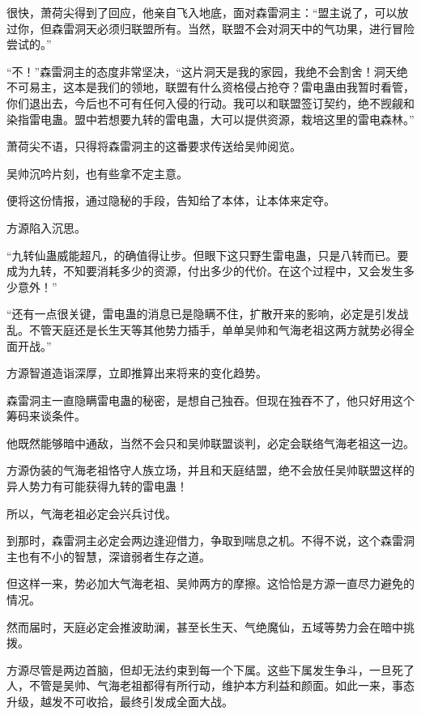 
\begin{this_body}



很快，萧荷尖得到了回应，他亲自飞入地底，面对森雷洞主：“盟主说了，可以放过你，但森雷洞天必须归联盟所有。当然，联盟不会对洞天中的气功果，进行冒险尝试的。”

“不！”森雷洞主的态度非常坚决，“这片洞天是我的家园，我绝不会割舍！洞天绝不可易主，这本是我们的领地，联盟有什么资格侵占抢夺？雷电蛊由我暂时看管，你们退出去，今后也不可有任何入侵的行动。我可以和联盟签订契约，绝不觊觎和染指雷电蛊。盟中若想要九转的雷电蛊，大可以提供资源，栽培这里的雷电森林。”

萧荷尖不语，只得将森雷洞主的这番要求传送给吴帅阅览。

吴帅沉吟片刻，也有些拿不定主意。

便将这份情报，通过隐秘的手段，告知给了本体，让本体来定夺。

方源陷入沉思。

“九转仙蛊威能超凡，的确值得让步。但眼下这只野生雷电蛊，只是八转而已。要成为九转，不知要消耗多少的资源，付出多少的代价。在这个过程中，又会发生多少意外！”

“还有一点很关键，雷电蛊的消息已是隐瞒不住，扩散开来的影响，必定是引发战乱。不管天庭还是长生天等其他势力插手，单单吴帅和气海老祖这两方就势必得全面开战。”

方源智道造诣深厚，立即推算出来将来的变化趋势。

森雷洞主一直隐瞒雷电蛊的秘密，是想自己独吞。但现在独吞不了，他只好用这个筹码来谈条件。

他既然能够暗中通敌，当然不会只和吴帅联盟谈判，必定会联络气海老祖这一边。

方源伪装的气海老祖恪守人族立场，并且和天庭结盟，绝不会放任吴帅联盟这样的异人势力有可能获得九转的雷电蛊！

所以，气海老祖必定会兴兵讨伐。

到那时，森雷洞主必定会两边逢迎借力，争取到喘息之机。不得不说，这个森雷洞主也有不小的智慧，深谙弱者生存之道。

但这样一来，势必加大气海老祖、吴帅两方的摩擦。这恰恰是方源一直尽力避免的情况。

然而届时，天庭必定会推波助澜，甚至长生天、气绝魔仙，五域等势力会在暗中挑拨。

方源尽管是两边首脑，但却无法约束到每一个下属。这些下属发生争斗，一旦死了人，不管是吴帅、气海老祖都得有所行动，维护本方利益和颜面。如此一来，事态升级，越发不可收拾，最终引发成全面大战。


\end{this_body}
